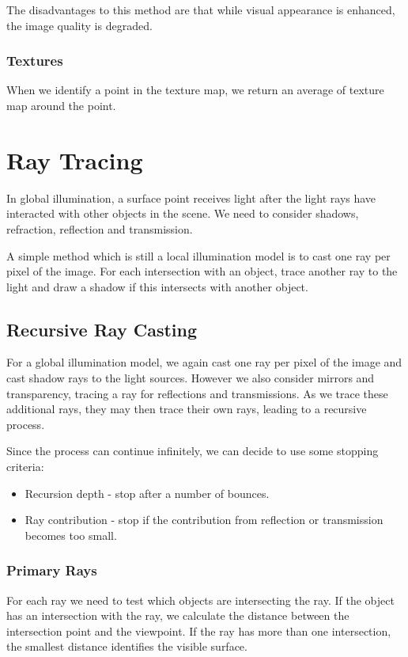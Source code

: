 \documentclass[11pt]{article}
\begin{document}
The disadvantages to this method are that while visual appearance is enhanced, the image quality is degraded.

\subsubsection{Textures}
When we identify a point in the texture map, we return an average of texture map around the point.

\section{Ray Tracing}
In global illumination, a surface point receives light after the light rays have interacted with other objects in the scene.
We need to consider shadows, refraction, reflection and transmission.

A simple method which is still a local illumination model is to cast one ray per pixel of the image.
For each intersection with an object, trace another ray to the light and draw a shadow if this intersects with another object.

\subsection{Recursive Ray Casting}
For a global illumination model, we again cast one ray per pixel of the image and cast shadow rays to the light sources.
However we also consider mirrors and transparency, tracing a ray for reflections and transmissions.
As we trace these additional rays, they may then trace their own rays, leading to a recursive process.

Since the process can continue infinitely, we can decide to use some stopping criteria:
\begin{itemize}
  \item Recursion depth - stop after a number of bounces.
  \item Ray contribution - stop if the contribution from reflection or transmission becomes too small.
\end{itemize}

\subsubsection{Primary Rays}
For each ray we need to test which objects are intersecting the ray.
If the object has an intersection with the ray, we calculate the distance between the intersection point and the viewpoint.
If the ray has more than one intersection, the smallest distance identifies the visible surface.
\end{document}
